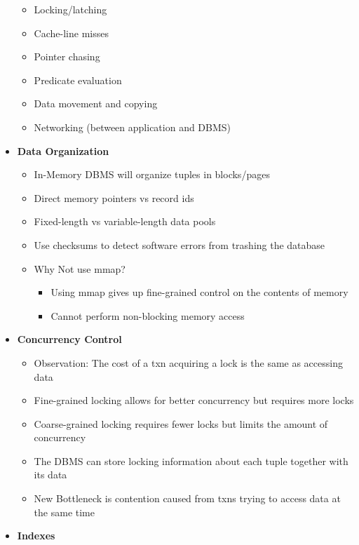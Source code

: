\documentclass[11pt]{article}
\begin{document}
\begin{itemize}
    \begin{itemize}
        \item Locking/latching
        \item Cache-line misses
        \item Pointer chasing
        \item Predicate evaluation
        \item Data movement and copying
        \item Networking (between application and DBMS)
    \end{itemize}
    \item \textbf{Data Organization}
    \begin{itemize}
        \item In-Memory DBMS will organize tuples in blocks/pages
        \item Direct memory pointers vs record ids
        \item Fixed-length vs variable-length data pools
        \item Use checksums to detect software errors from trashing the database
        \item Why Not use mmap?
        \begin{itemize}
            \item Using mmap gives up fine-grained control on the contents of memory
            \item Cannot perform non-blocking memory access
        \end{itemize}
    \end{itemize}
    \item \textbf{Concurrency Control}
    \begin{itemize}
        \item Observation: The cost of a txn acquiring a lock is the same as accessing data
        \item Fine-grained locking allows for better concurrency but requires more locks
        \item Coarse-grained locking requires fewer locks but limits the amount of concurrency
        \item The DBMS can store locking information about each tuple together with its data
        \item New Bottleneck is contention caused from txns trying to access data at the same time
    \end{itemize}
    \item \textbf{Indexes}
    \begin{itemize}

\end{itemize}
\end{itemize}
\end{document}
